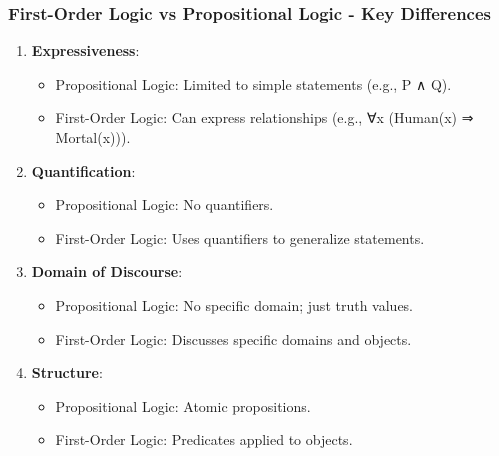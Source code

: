 \documentclass[aspectratio=169]{beamer}
\begin{document}
\begin{frame}[fragile]
    \frametitle{First-Order Logic vs Propositional Logic - Key Differences}
    
    \begin{enumerate}
        \item \textbf{Expressiveness}: 
        \begin{itemize}
            \item Propositional Logic: Limited to simple statements (e.g., P ∧ Q).
            \item First-Order Logic: Can express relationships (e.g., ∀x (Human(x) ⇒ Mortal(x))).
        \end{itemize}
        
        \item \textbf{Quantification}: 
        \begin{itemize}
            \item Propositional Logic: No quantifiers.
            \item First-Order Logic: Uses quantifiers to generalize statements.
        \end{itemize}
        
        \item \textbf{Domain of Discourse}: 
        \begin{itemize}
            \item Propositional Logic: No specific domain; just truth values.
            \item First-Order Logic: Discusses specific domains and objects.
        \end{itemize}
        
        \item \textbf{Structure}: 
        \begin{itemize}
            \item Propositional Logic: Atomic propositions.
            \item First-Order Logic: Predicates applied to objects.
        \end{itemize}
    \end{enumerate}
\end{frame}
\end{document}
